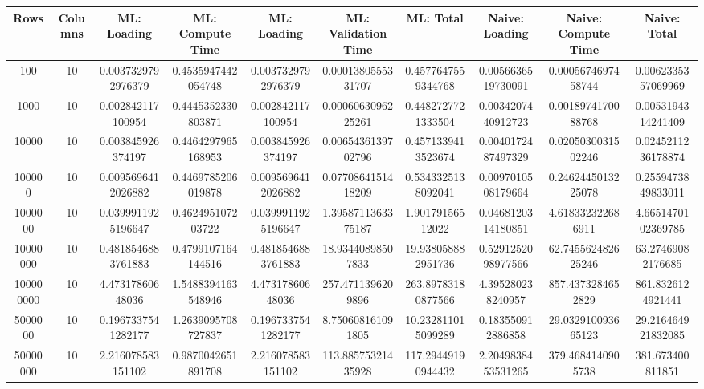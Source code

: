 \begin{table}[htb]
    \centering
    \begin{tabular}{@{}cccccccccc@{}}
        \toprule
        Rows & Columns & ML: Loading & ML: Compute Time & ML: Loading & ML: Validation Time & ML: Total & Naive: Loading & Naive: Compute Time & Naive: Total \\
        \midrule
        100 & 10 & 0.0037329792976379 & 0.4535947442054748 & 0.0037329792976379 & 0.0001380555331707 & 0.4577647559344768 & 0.0056636519730091 & 0.0005674697458744 & 0.0062335357069969 \\
        1000 & 10 & 0.002842117100954 & 0.4445352330803871 & 0.002842117100954 & 0.0006063096225261 & 0.4482727721333504 & 0.0034207440912723 & 0.0018974170088768 & 0.0053194314241409 \\
        10000 & 10 & 0.003845926374197 & 0.4464297965168953 & 0.003845926374197 & 0.0065436139702796 & 0.4571339413523674 & 0.0040172487497329 & 0.0205030031502246 & 0.0245211236178874 \\
        100000 & 10 & 0.0095696412026882 & 0.4469785206019878 & 0.0095696412026882 & 0.0770864151418209 & 0.5343325138092041 & 0.0097010508179664 & 0.2462445013225078 & 0.2559473849833011 \\
        1000000 & 10 & 0.0399911925196647 & 0.462495107203722 & 0.0399911925196647 & 1.3958711363375187 & 1.90179156512022 & 0.0468120314180851 & 4.618332322686911 & 4.6651470102369785 \\
        10000000 & 10 & 0.4818546883761883 & 0.4799107164144516 & 0.4818546883761883 & 18.93440898507833 & 19.938058882951736 & 0.5291252098977566 & 62.745562482625246 & 63.27469082176685 \\
        100000000 & 10 & 4.47317860648036 & 1.5488394163548946 & 4.47317860648036 & 257.4711396209896 & 263.89783180877566 & 4.395280238240957 & 857.4373284652829 & 861.8326124921441 \\
        5000000 & 10 & 0.1967337541282177 & 1.2639095708727837 & 0.1967337541282177 & 8.750608161091805 & 10.232811015099289 & 0.183550912886858 & 29.032910093665123 & 29.216464921832085 \\
        50000000 & 10 & 2.216078583151102 & 0.9870042651891708 & 2.216078583151102 & 113.88575321435928 & 117.29449190944432 & 2.2049838453531265 & 379.4684140905738 & 381.673400811851 \\
        \bottomrule
    \end{tabular}
\end{table}